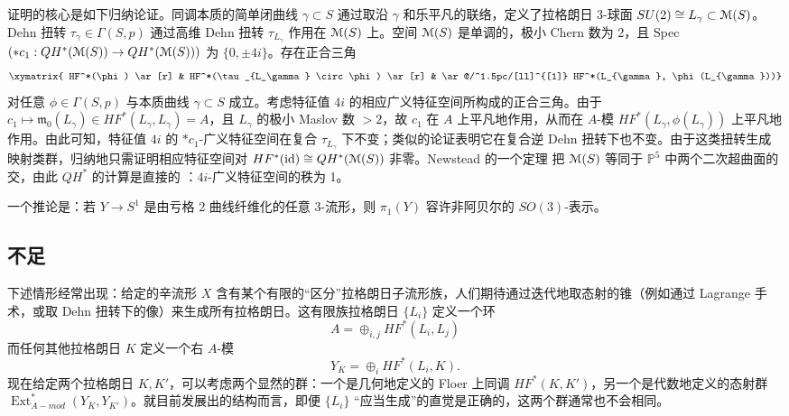 \documentclass[11pt,a4paper]{article}
\numberwithin{equation}{section}
\newcommand{\bP}{\mathbb{P}}
\newcommand{\scrM}{\EuScript{M}}
\newcommand{\id}{\mathrm{id}}
\newcommand{\Ext}{\operatorname{Ext}}
\providecommand{\frak}[1]{\mathfrak{#1}}
\begin{document}
证明的核心是如下归纳论证。同调本质的简单闭曲线 $\gamma \subset S$ 通过取沿 $\gamma$ 和乐平凡的联络，定义了拉格朗日 3-球面 $SU(2) \cong L_\gamma \subset \scrM(S)$。Dehn 扭转 $\tau_\gamma \in \Gamma(S,p)$ 通过高维 Dehn 扭转 $\tau_{L_{\gamma}}$ 作用在 $\scrM(S)$ 上。空间 $\scrM(S)$ 是单调的，极小 Chern 数为 2，且 Spec$(\ast c_1: QH^*(\scrM(S)) \rightarrow QH^*(\scrM(S)))$ 为 $\{0, \pm 4i\}$。存在正合三角
\begin{equation} \label{Eqn:InductiveTriangle}
\xymatrix{ HF^*(\phi) \ar[r] & HF^*(\tau_{L_\gamma} \circ \phi)  \ar[r] & \ar@/^1.5pc/[ll]^{[1]} HF^*(L_{\gamma}, \phi(L_{\gamma}))}
\end{equation}
对任意 $\phi \in \Gamma(S,p)$ 与本质曲线 $\gamma \subset S$ 成立。考虑特征值 $4i$ 的相应广义特征空间所构成的正合三角。由于 $c_1 \mapsto \frak{m}_0(L_{\gamma}) \in HF^*(L_{\gamma}, L_{\gamma}) = A$，且 $L_{\gamma}$ 的极小 Maslov 数 $>2$，故 $c_1$ 在 $A$ 上平凡地作用，从而在 $A$-模 $HF^*(L_{\gamma}, \phi(L_{\gamma}))$ 上平凡地作用。由此可知，特征值 $4i$ 的 $\ast c_1$-广义特征空间在复合 $\tau_{L_{\gamma}}$ 下不变；类似的论证表明它在复合逆 Dehn 扭转下也不变。由于这类扭转生成映射类群，归纳地只需证明相应特征空间对 $HF^*(\id)\cong QH^*(\scrM(S))$ 非零。Newstead 的一个定理 \cite{Newstead} 把 $\scrM(S)$ 等同于 $\bP^5$ 中两个二次超曲面的交，由此 $QH^*$ 的计算是直接的 \cite{SKD}：$4i$-广义特征空间的秩为 1。

一个推论是：若 $Y \rightarrow S^1$ 是由亏格 2 曲线纤维化的任意 3-流形，则 $\pi_1(Y)$ 容许非阿贝尔的 $SO(3)$-表示。

\subsection{不足}\label{Subsec:Shortcoming}

下述情形经常出现：给定的辛流形 $X$ 含有某个有限的“区分”拉格朗日子流形族，人们期待通过迭代地取态射的锥（例如通过 Lagrange 手术，或取 Dehn 扭转下的像）来生成所有拉格朗日。这有限族拉格朗日 $\{L_i\}$ 定义一个环
\[
A = \oplus_{i,j} HF^*(L_i, L_j)
\]
而任何其他拉格朗日 $K$ 定义一个右 $A$-模
\[
Y_K = \oplus_i HF^*(L_i, K).
\]
现在给定两个拉格朗日 $K, K'$，可以考虑两个显然的群：一个是几何地定义的 Floer 上同调 $HF^*(K,K')$，另一个是代数地定义的态射群 $\Ext_{A-mod}^*(Y_K, Y_{K'})$。就目前发展出的结构而言，即便 $\{L_i\}$ “应当生成”的直觉是正确的，这两个群通常也不会相同。
\end{document}
